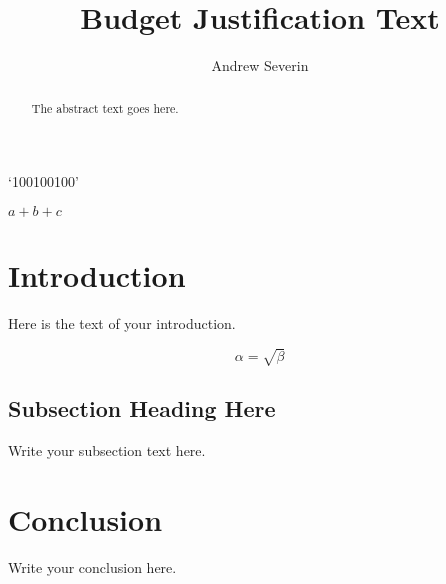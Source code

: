 \documentclass{article}
\newcommand{\testvariable}{100}
\begin{document}
\title{Budget Justification Text}
\author{Andrew Severin}

\maketitle

`\testvariable \testvariable \testvariable'

$a + b + c$

\begin{abstract}
The abstract text goes here.
\end{abstract}

\section{Introduction}
Here is the text of your introduction.

%

\begin{equation}
    \label{simple_equation}
    \alpha = \sqrt{ \beta }
\end{equation}

\subsection{Subsection Heading Here}
Write your subsection text here.


\section{Conclusion}
Write your conclusion here.
\end{document}

